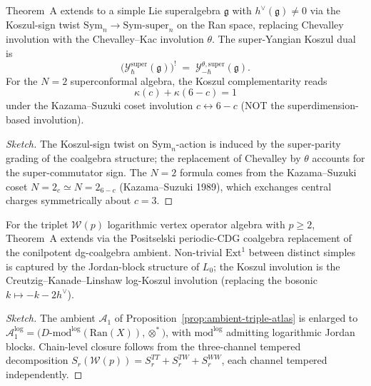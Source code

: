 \documentclass[11pt]{article}
\begin{document}
\begin{theorem}
\label{thm:super-voa-bar-cobar}
Theorem~A extends to a simple Lie superalgebra $\mathfrak{g}$ with
$h^{\vee}(\mathfrak{g}) \ne 0$ via the Koszul-sign twist
$\mathrm{Sym}_n \to \mathrm{Sym}\text{-super}_n$
on the Ran space, replacing Chevalley involution with the
Chevalley--Kac involution $\theta$. The super-Yangian Koszul dual is
\[
  \bigl(\mathcal{Y}_{\hbar}^{\mathrm{super}}(\mathfrak{g})\bigr)^{!}
  \;=\;
  \mathcal{Y}_{-\hbar}^{\theta, \mathrm{super}}(\mathfrak{g}).
\]
For the $N = 2$ superconformal algebra, the Koszul complementarity reads
\[
  \kappa(c) + \kappa(6 - c) = 1
\]
under the Kazama--Suzuki coset involution $c \leftrightarrow 6 - c$
(NOT the superdimension-based involution).
\end{theorem}

\begin{proof}[Sketch]
The Koszul-sign twist on $\mathrm{Sym}_n$-action is induced by the
super-parity grading of the coalgebra structure; the replacement of
Chevalley by $\theta$ accounts for the super-commutator sign. The
$N = 2$ formula comes from the Kazama--Suzuki coset
$N=2_{c} \simeq N=2_{6-c}$ (Kazama--Suzuki 1989), which exchanges
central charges symmetrically about $c = 3$.
\end{proof}

\begin{theorem}
\label{thm:log-wp-bar-cobar}
For the triplet $\mathcal{W}(p)$ logarithmic vertex operator algebra with
$p \ge 2$, Theorem~A extends via the Positselski periodic-CDG
coalgebra replacement of the conilpotent dg-coalgebra ambient.
Non-trivial $\mathrm{Ext}^1$ between distinct simples is captured by
the Jordan-block structure of $L_0$; the Koszul involution is the
Creutzig--Kanade--Linshaw log-Koszul involution (replacing the bosonic
$k \mapsto -k-2h^{\vee}$).
\end{theorem}

\begin{proof}[Sketch]
The ambient $\mathcal{A}_1$ of
Proposition~\ref{prop:ambient-triple-atlas} is enlarged to
$\mathcal{A}_1^{\mathrm{log}} = \bigl(D\text{-}\mathrm{mod}^{\mathrm{log}}(\mathrm{Ran}(X)),
\otimes^*\bigr)$, with $\mathrm{mod}^{\mathrm{log}}$ admitting logarithmic
Jordan blocks. Chain-level closure follows from the three-channel
tempered decomposition $S_r(\mathcal{W}(p)) = S_r^{TT} + S_r^{TW} + S_r^{WW}$,
each channel tempered independently.
\end{proof}
\end{document}
